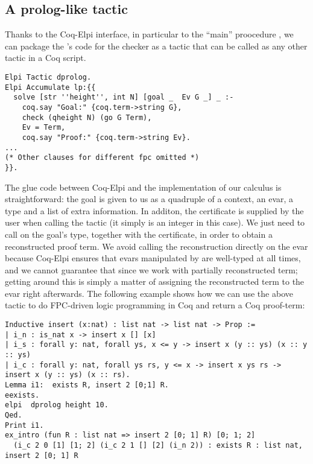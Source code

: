 

\subsection{A prolog-like tactic}

Thanks to the Coq-Elpi interface, in particular to the ``main''
proocedure , we can package the \lP's code for the checker
as a tactic that can be called as any other tactic in a Coq script.

\begin{lstlisting}
Elpi Tactic dprolog.
Elpi Accumulate lp:{{
  solve [str ''height'', int N] [goal _  Ev G _] _ :-
    coq.say "Goal:" {coq.term->string G},
    check (qheight N) (go G Term),
    Ev = Term,
    coq.say "Proof:" {coq.term->string Ev}.
...
(* Other clauses for different fpc omitted *)
}}.
\end{lstlisting}

The glue code between Coq-Elpi and the implementation of our calculus is
straightforward: the goal is given to us as a quadruple of a context, an
evar, a type and a list of extra information. In additon, the certificate is
supplied by the user when calling the tactic (it simply is an integer in this
case). We just need to call  on the goal's type, together with
the certificate, in order to obtain a reconstructed proof term. We avoid
calling the reconstruction directly on the evar because Coq-Elpi ensures that
evars manipulated by \lP are well-typed at all times, and we cannot guarantee
that since we work with partially reconstructed term; getting around this is
simply a matter of assigning the reconstructed term to the evar right
afterwards.
The following example shows how we can use the above tactic to do
FPC-driven logic programming in Coq and return a Coq proof-term:
\begin{lstlisting}
Inductive insert (x:nat) : list nat -> list nat -> Prop :=
| i_n : is_nat x -> insert x [] [x]
| i_s : forall y: nat, forall ys, x <= y -> insert x (y :: ys) (x :: y :: ys)
| i_c : forall y: nat, forall ys rs, y <= x -> insert x ys rs -> insert x (y :: ys) (x :: rs).
Lemma i1:  exists R, insert 2 [0;1] R.
eexists.
elpi  dprolog height 10.
Qed.
Print i1.
ex_intro (fun R : list nat => insert 2 [0; 1] R) [0; 1; 2]
  (i_c 2 0 [1] [1; 2] (i_c 2 1 [] [2] (i_n 2)) : exists R : list nat, insert 2 [0; 1] R
\end{lstlisting}

